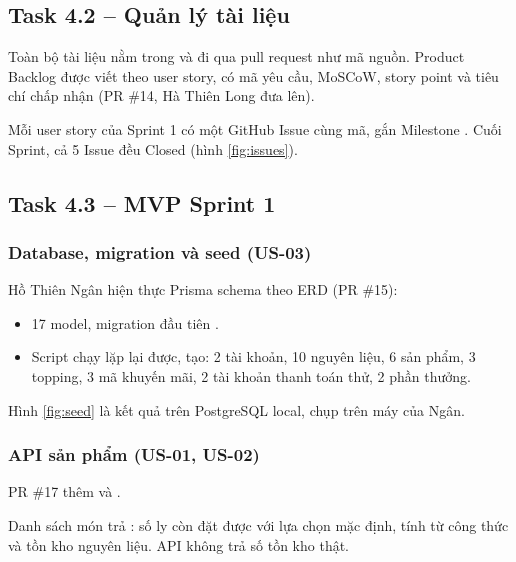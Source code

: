 \subsection{Task 4.2 -- Quản lý tài liệu}
Toàn bộ tài liệu nằm trong  và đi qua pull request như mã nguồn. Product Backlog được viết theo user story, có mã yêu cầu, MoSCoW, story point và tiêu chí chấp nhận (PR \#14, Hà Thiên Long đưa lên).

Mỗi user story của Sprint 1 có một GitHub Issue cùng mã, gắn Milestone . Cuối Sprint, cả 5 Issue đều Closed (hình \ref{fig:issues}).


\subsection{Task 4.3 -- MVP Sprint 1}

\subsubsection{Database, migration và seed (US-03)}
Hồ Thiên Ngân hiện thực Prisma schema theo ERD (PR \#15):
\begin{itemize}
\item 17 model, migration đầu tiên .
\item Script  chạy lặp lại được, tạo: 2 tài khoản, 10 nguyên liệu, 6 sản phẩm, 3 topping, 3 mã khuyến mãi, 2 tài khoản thanh toán thử, 2 phần thưởng.
\end{itemize}

Hình \ref{fig:seed} là kết quả  trên PostgreSQL local, chụp trên máy của Ngân.


\subsubsection{API sản phẩm (US-01, US-02)}
PR \#17 thêm  và .

Danh sách món trả : số ly còn đặt được với lựa chọn mặc định, tính từ công thức và tồn kho nguyên liệu. API không trả số tồn kho thật.

